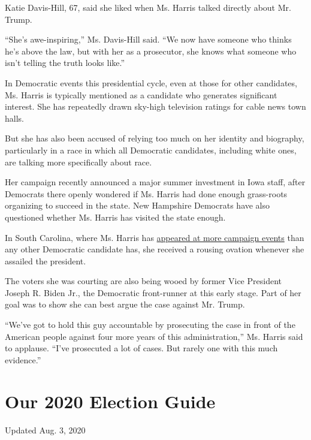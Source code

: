 Katie Davis-Hill, 67, said she liked when Ms. Harris talked directly
about Mr. Trump.

``She's awe-inspiring,'' Ms. Davis-Hill said. ``We now have someone who
thinks he's above the law, but with her as a prosecutor, she knows what
someone who isn't telling the truth looks like.''

In Democratic events this presidential cycle, even at those for other
candidates, Ms. Harris is typically mentioned as a candidate who
generates significant interest. She has repeatedly drawn sky-high
television ratings for cable news town halls.

But she has also been accused of relying too much on her identity and
biography, particularly in a race in which all Democratic candidates,
including white ones, are talking more specifically about race.

Her campaign recently announced a major summer investment in Iowa staff,
after Democrats there openly wondered if Ms. Harris had done enough
grass-roots organizing to succeed in the state. New Hampshire Democrats
have also questioned whether Ms. Harris has visited the state enough.

In South Carolina, where Ms. Harris has
\href{https://www.nytimes3xbfgragh.onion/2019/01/29/us/politics/kamala-harris-black-voters.html?searchResultPosition=1}{appeared
at more campaign events} than any other Democratic candidate has, she
received a rousing ovation whenever she assailed the president.

The voters she was courting are also being wooed by former Vice
President Joseph R. Biden Jr., the Democratic front-runner at this early
stage. Part of her goal was to show she can best argue the case against
Mr. Trump.

``We've got to hold this guy accountable by prosecuting the case in
front of the American people against four more years of this
administration,'' Ms. Harris said to applause. ``I've prosecuted a lot
of cases. But rarely one with this much evidence.''

\hypertarget{our-2020-election-guide}{%
\section{Our 2020 Election Guide}\label{our-2020-election-guide}}

Updated Aug. 3, 2020

